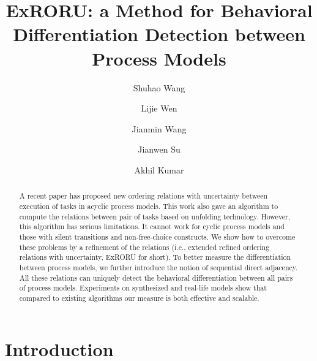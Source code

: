 \documentclass[dvips,...]{llncs}
\begin{document}
\frontmatter 
\pagestyle{headings}

\mainmatter
\title{ExRORU: a Method for Behavioral Differentiation Detection between Process Models}

\author[$1$]{Shuhao Wang}
\author[$1$]{Lijie Wen}
\author[$1$]{Jianmin Wang}
\author[$2$]{Jianwen Su}
\author[$3$]{Akhil Kumar}
\institute{}

\maketitle

\begin{abstract}
A recent paper has proposed new ordering relations with uncertainty between execution of tasks in acyclic process models. This work also gave an algorithm to compute the relations between pair of tasks based on unfolding technology. However, this algorithm has serious limitations. It cannot work for cyclic process models and those with silent transitions and non-free-choice constructs. We show how to overcome these problems by a refinement of the relations (i.e., extended refined ordering relations with uncertainty, ExRORU for short). To better measure the differentiation between process models, we further introduce the notion of sequential direct adjacency. All these relations can uniquely detect the behavioral differentiation between all pairs of process models. Experiments on synthesized and real-life models show that compared to existing algorithms our measure is both effective and scalable.
\end{abstract}

\section{Introduction}\label{sec:introduction}
\end{document}
